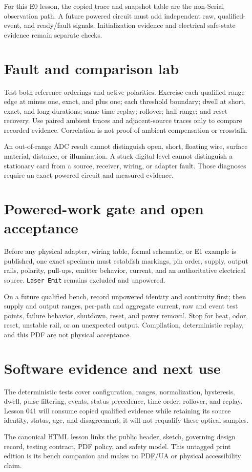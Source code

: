 \documentclass[11pt]{article}
\begin{document}
For this E0 lesson, the copied trace and snapshot table are the non-Serial
observation path. A future powered circuit must add independent raw,
qualified-event, and ready/fault signals. Initialization evidence and
electrical safe-state evidence remain separate checks.

\section{Fault and comparison lab}
Test both reference orderings and active polarities. Exercise each qualified
range edge at minus one, exact, and plus one; each threshold boundary; dwell at
short, exact, and long durations; same-time replay; rollover; half-range; and
reset recovery. Use paired ambient traces and adjacent-source traces only to
compare recorded evidence. Correlation is not proof of ambient compensation or
crosstalk.

An out-of-range ADC result cannot distinguish open, short, floating wire,
surface material, distance, or illumination. A stuck digital level cannot
distinguish a stationary card from a source, receiver, wiring, or adapter
fault. Those diagnoses require an exact powered circuit and measured evidence.

\section{Powered-work gate and open acceptance}
Before any physical adapter, wiring table, formal schematic, or E1 example is
published, one exact specimen must establish markings, pin order, supply,
output rails, polarity, pull-ups, emitter behavior, current, and an
authoritative electrical source. \texttt{Laser Emit} remains excluded and
unpowered.

On a future qualified bench, record unpowered identity and continuity first;
then supply and output ranges, per-path and aggregate current, raw and event
test points, failure behavior, shutdown, reset, and power removal. Stop for
heat, odor, reset, unstable rail, or an unexpected output. Compilation,
deterministic replay, and this PDF are not physical acceptance.

\section{Software evidence and next use}
The deterministic tests cover configuration, ranges, normalization,
hysteresis, dwell, pulse filtering, events, status precedence, time order,
rollover, and replay. Lesson 041 will consume copied qualified evidence while
retaining its source identity, status, age, and disagreement; it will not
requalify these optical samples.

The canonical HTML lesson links the public header, sketch, governing design
record, testing contract, PDF policy, and safety model. This untagged print
edition is its bench companion and makes no PDF/UA or physical accessibility
claim.
\end{document}
